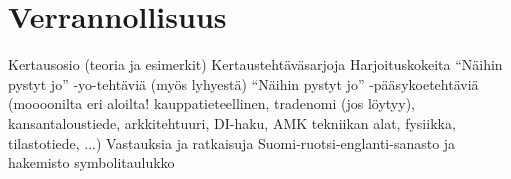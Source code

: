 \chapter{Verrannollisuus}

    Kertausosio (teoria ja esimerkit)
    Kertaustehtäväsarjoja
    Harjoituskokeita
    “Näihin pystyt jo” -yo-tehtäviä (myös lyhyestä)
    “Näihin pystyt jo” -pääsykoetehtäviä (moooonilta eri     aloilta! kauppatieteellinen, tradenomi (jos löytyy), kansantaloustiede, arkkitehtuuri, DI-haku, AMK tekniikan alat, fysiikka, tilastotiede, ...)
    Vastauksia ja ratkaisuja
    Suomi-ruotsi-englanti-sanasto ja hakemisto
    symbolitaulukko

